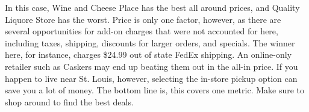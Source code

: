 \pagebreak

In this case, Wine and Cheese Place has the best all around prices, and Quality Liquore Store has the worst. Price is only one factor, however, as there are several opportunities for add-on charges that were not accounted for here, including taxes, shipping, discounts for larger orders, and specials. The winner here, for instance, charges \$24.99 out of state FedEx shipping. An online-only retailer such as Caskers may end up beating them out in the all-in price. If you happen to live near St. Louis, however, selecting the in-store pickup option can save you a lot of money. The bottom line is, this covers one metric. Make sure to shop around to find the best deals.